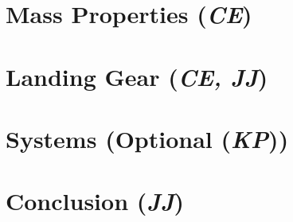 \documentclass[conf]{new-aiaa}
\begin{document}
\section{Mass Properties (\textit{CE})}
\label{section: Mass Properties}


\section{Landing Gear (\textit{CE, JJ})}
\label{section: Landing Gear}


\section{Systems (Optional (\textit{KP}))}
\label{section: Systems}


% 

\section{Conclusion (\textit{JJ})}
\label{section: Conclusion}



% 


\end{document}
